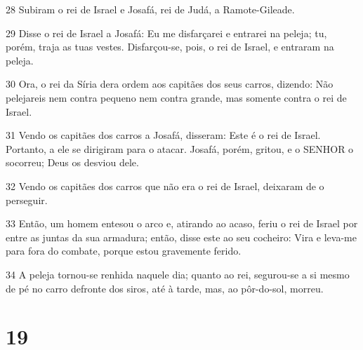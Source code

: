 \par 28 Subiram o rei de Israel e Josafá, rei de Judá, a Ramote-Gileade.
\par 29 Disse o rei de Israel a Josafá: Eu me disfarçarei e entrarei na peleja; tu, porém, traja as tuas vestes. Disfarçou-se, pois, o rei de Israel, e entraram na peleja.
\par 30 Ora, o rei da Síria dera ordem aos capitães dos seus carros, dizendo: Não pelejareis nem contra pequeno nem contra grande, mas somente contra o rei de Israel.
\par 31 Vendo os capitães dos carros a Josafá, disseram: Este é o rei de Israel. Portanto, a ele se dirigiram para o atacar. Josafá, porém, gritou, e o SENHOR o socorreu; Deus os desviou dele.
\par 32 Vendo os capitães dos carros que não era o rei de Israel, deixaram de o perseguir.
\par 33 Então, um homem entesou o arco e, atirando ao acaso, feriu o rei de Israel por entre as juntas da sua armadura; então, disse este ao seu cocheiro: Vira e leva-me para fora do combate, porque estou gravemente ferido.
\par 34 A peleja tornou-se renhida naquele dia; quanto ao rei, segurou-se a si mesmo de pé no carro defronte dos siros, até à tarde, mas, ao pôr-do-sol, morreu.

\chapter{19}

